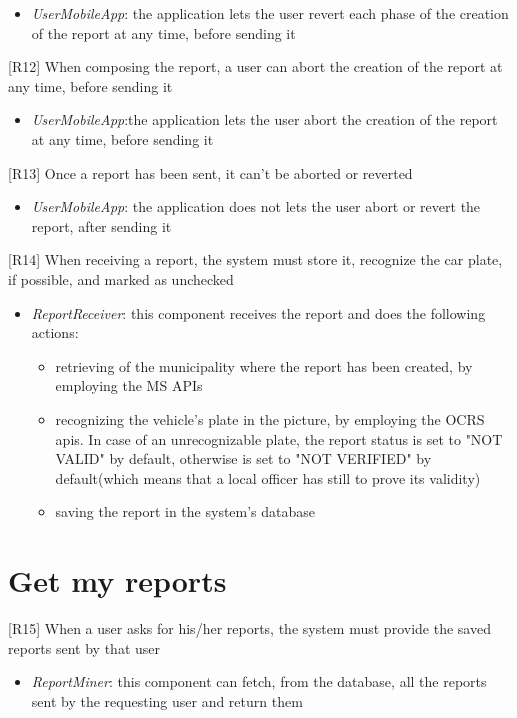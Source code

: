 					\begin{itemize}
						\item \textit{UserMobileApp}: the application lets the user revert each phase of the creation of the report at any time, before sending it
					\end{itemize}
			{[R12]} When composing the report, a user can abort the creation of the report at any time, before sending it
					\begin{itemize}
						\item \textit{UserMobileApp}:the application lets the user abort the creation of the report at any time, before sending it
					\end{itemize}
			{[R13]} Once a report has been sent, it can't be aborted or reverted
					\begin{itemize}
						\item \textit{UserMobileApp}: the application does not lets the user abort or revert the report, after sending it
					\end{itemize}
			{[R14]} When receiving a report, the system must store it, recognize the car plate, if possible, and marked as unchecked
					\begin{itemize}
						\item \textit{ReportReceiver}: this component receives the report and does the following actions:
							\begin{itemize}
								\item retrieving of the municipality where the report has been created, by employing the MS APIs
								\item recognizing the vehicle's plate in the picture, by employing the OCRS apis. In case of an unrecognizable plate, the report status is set to "NOT VALID" by default, otherwise is set to "NOT VERIFIED" by default(which means that a local officer has still to prove its validity)
								\item saving the report in the system's database
							\end{itemize}
					\end{itemize}

		\section{Get my reports}
			{[R15]} When a user asks for his/her reports, the system must provide the saved reports sent by that user
					\begin{itemize}
						\item \textit{ReportMiner}: this component can fetch, from the database, all the reports sent by the requesting user and return them
					\end{itemize}
